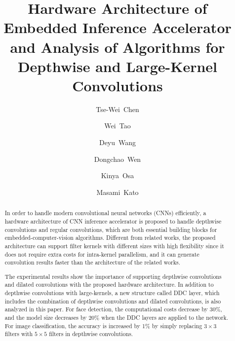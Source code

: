 \documentclass[runningheads]{llncs}
\begin{document}
\pagestyle{headings}
\mainmatter
\def\ECCVSubNumber{1}  

\title{Hardware Architecture of Embedded Inference Accelerator and Analysis of Algorithms for Depthwise and Large-Kernel Convolutions} 



\author{Tse-Wei~Chen \and
Wei~Tao \and
Deyu~Wang \and
Dongchao~Wen  \and
Kinya~Osa  \and
Masami~Kato
}
\maketitle

\begin{abstract}
In order to handle modern convolutional neural networks (CNNs) efficiently, a hardware architecture of CNN inference accelerator is proposed to handle depthwise convolutions and regular convolutions, which are both essential building blocks for embedded-computer-vision algorithms. Different from related works, the proposed architecture can support filter kernels with different sizes with high flexibility since it does not require extra costs for intra-kernel parallelism, and it can generate convolution results faster than the architecture of the related works. 

The experimental results show the importance of supporting depthwise convolutions and dilated convolutions with the proposed hardware architecture. In addition to depthwise convolutions with large-kernels, a new structure called DDC layer, which includes the combination of depthwise convolutions and dilated convolutions, is also analyzed in this paper. For face detection, the computational costs decrease by 30\%, and the model size decreases by 20\% when the DDC layers are applied to the network. For image classification, the accuracy is increased by 1\% by simply replacing $3 \times 3$ filters with $5 \times 5$ filters in depthwise convolutions.

\end{abstract}
\end{document}
